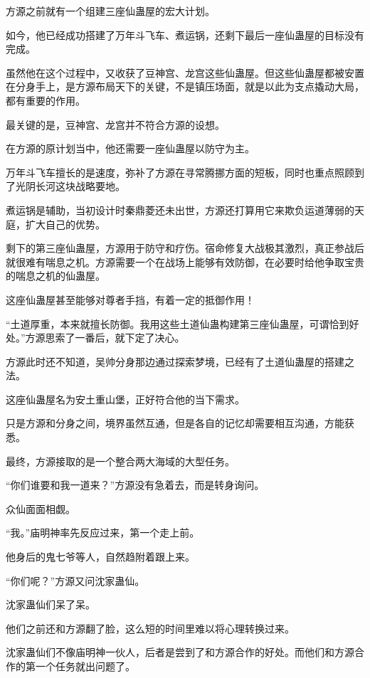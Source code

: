 
\begin{this_body}



方源之前就有一个组建三座仙蛊屋的宏大计划。

如今，他已经成功搭建了万年斗飞车、煮运锅，还剩下最后一座仙蛊屋的目标没有完成。

虽然他在这个过程中，又收获了豆神宫、龙宫这些仙蛊屋。但这些仙蛊屋都被安置在分身手上，是方源布局天下的关键，不是镇压场面，就是以此为支点撬动大局，都有重要的作用。

最关键的是，豆神宫、龙宫并不符合方源的设想。

在方源的原计划当中，他还需要一座仙蛊屋以防守为主。

万年斗飞车擅长的是速度，弥补了方源在寻常腾挪方面的短板，同时也重点照顾到了光阴长河这块战略要地。

煮运锅是辅助，当初设计时秦鼎菱还未出世，方源还打算用它来欺负运道薄弱的天庭，扩大自己的优势。

剩下的第三座仙蛊屋，方源用于防守和疗伤。宿命修复大战极其激烈，真正参战后就很难有喘息之机。方源需要一个在战场上能够有效防御，在必要时给他争取宝贵的喘息之机的仙蛊屋。

这座仙蛊屋甚至能够对尊者手挡，有着一定的抵御作用！

“土道厚重，本来就擅长防御。我用这些土道仙蛊构建第三座仙蛊屋，可谓恰到好处。”方源思索了一番后，就下定了决心。

方源此时还不知道，吴帅分身那边通过探索梦境，已经有了土道仙蛊屋的搭建之法。

这座仙蛊屋名为安土重山堡，正好符合他的当下需求。

只是方源和分身之间，境界虽然互通，但是各自的记忆却需要相互沟通，方能获悉。

最终，方源接取的是一个整合两大海域的大型任务。

“你们谁要和我一道来？”方源没有急着去，而是转身询问。

众仙面面相觑。

“我。”庙明神率先反应过来，第一个走上前。

他身后的鬼七爷等人，自然趋附着跟上来。

“你们呢？”方源又问沈家蛊仙。

沈家蛊仙们呆了呆。

他们之前还和方源翻了脸，这么短的时间里难以将心理转换过来。

沈家蛊仙们不像庙明神一伙人，后者是尝到了和方源合作的好处。而他们和方源合作的第一个任务就出问题了。


\end{this_body}
